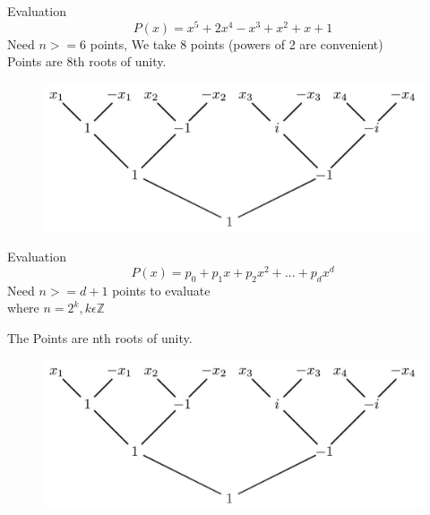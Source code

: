 \documentclass{beamer}
\begin{document}
\begin{frame}{Evaluation}
   $$P(x) = x^5 + 2x^4 - x^3 + x^2 +x + 1$$ 
   Need $n>=6$ points, We take 8 points (powers of 2 are convenient)\\
   Points are 8th roots of unity.
   \begin{figure}
       \centering
       \includegraphics[width=1\textwidth]{5throot.jpg}
       
       \label{fig:enter-label}
   \end{figure}
            
       
\end{frame}

       \begin{frame}{Evaluation}
       \centering
   $$P(x) =p_0 + p_1x + p_2x^2 + ... + p_dx^d$$
        Need $n>=d+1$ points to evaluate \\
        where $n = 2^k , k \epsilon   \mathbb{Z} $ 

    The Points are nth roots of unity.

    \begin{figure}
       \centering
       \includegraphics[width=1\textwidth]{5throot.jpg}
       
       \label{fig:enter-label}
   \end{figure}
       
        
   \end{frame}
\end{document}
